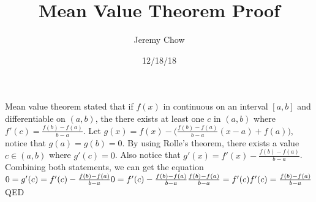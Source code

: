 \documentclass[12pt]{article}
\title{Mean Value Theorem Proof}
\author{Jeremy Chow}
\date{12/18/18}
\begin{document}
\maketitle
Mean value theorem stated that if $f(x)$ in continuous on an interval $[a,b]$ and differentiable on $(a,b)$, the there exists at least one $c$ in $(a,b)$ where $f'(c)=\frac{f(b)-f(a)}{b-a}$. Let $g(x)=f(x)-\big(\frac{f(b)-f(a)}{b-a}(x-a)+f(a)\big)$, notice that $g(a)=g(b)=0$. By using Rolle's theorem, there exists a value $c \in (a,b)$ where $g'(c)=0$. Also notice that $g'(x)=f'(x)-\frac{f(b)-f(a)}{b-a}$. Combining both statements, we can get the equation\\$0=g'(c)=f'(c)-\frac{f(b)-f(a)}{b-a}\\0=f'(c)-\frac{f(b)-f(a)}{b-a}\\\frac{f(b)-f(a)}{b-a}=f'(c)\\f'(c)=\frac{f(b)-f(a)}{b-a}$\\QED
\end{document}
